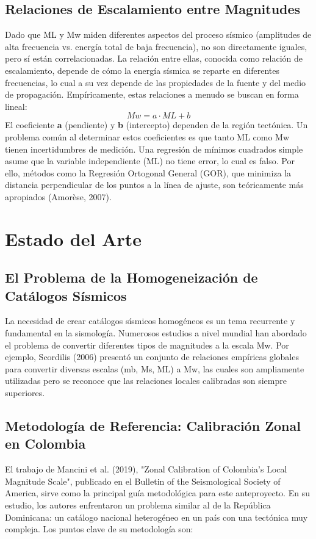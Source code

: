 \documentclass[12pt,a4paper]{article}
\begin{document}
\subsection{Relaciones de Escalamiento entre Magnitudes}
Dado que ML y Mw miden diferentes aspectos del proceso sísmico (amplitudes de alta frecuencia vs. energía total de baja frecuencia), no son directamente iguales, pero sí están correlacionadas. La relación entre ellas, conocida como relación de escalamiento, depende de cómo la energía sísmica se reparte en diferentes frecuencias, lo cual a su vez depende de las propiedades de la fuente y del medio de propagación. Empíricamente, estas relaciones a menudo se buscan en forma lineal:
\begin{equation}
Mw = a \cdot ML + b
\end{equation}
El coeficiente \textbf{a} (pendiente) y \textbf{b} (intercepto) dependen de la región tectónica. Un problema común al determinar estos coeficientes es que tanto ML como Mw tienen incertidumbres de medición. Una regresión de mínimos cuadrados simple asume que la variable independiente (ML) no tiene error, lo cual es falso. Por ello, métodos como la Regresión Ortogonal General (GOR), que minimiza la distancia perpendicular de los puntos a la línea de ajuste, son teóricamente más apropiados (Amorèse, 2007).

\section{Estado del Arte}
\subsection{El Problema de la Homogeneización de Catálogos Sísmicos}
La necesidad de crear catálogos sísmicos homogéneos es un tema recurrente y fundamental en la sismología. Numerosos estudios a nivel mundial han abordado el problema de convertir diferentes tipos de magnitudes a la escala Mw. Por ejemplo, Scordilis (2006) presentó un conjunto de relaciones empíricas globales para convertir diversas escalas (mb, Ms, ML) a Mw, las cuales son ampliamente utilizadas pero se reconoce que las relaciones locales calibradas son siempre superiores.

\subsection{Metodología de Referencia: Calibración Zonal en Colombia}
El trabajo de Mancini et al. (2019), "Zonal Calibration of Colombia’s Local Magnitude Scale", publicado en el Bulletin of the Seismological Society of America, sirve como la principal guía metodológica para este anteproyecto. En su estudio, los autores enfrentaron un problema similar al de la República Dominicana: un catálogo nacional heterogéneo en un país con una tectónica muy compleja. Los puntos clave de su metodología son:
\end{document}
